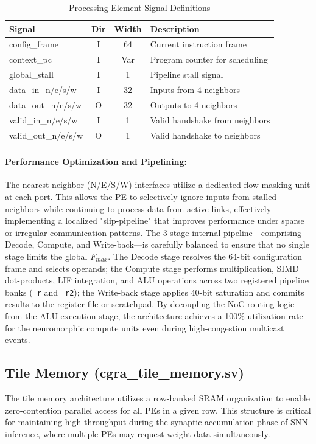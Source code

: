 \begin{table}[ht!]
\centering
\singlespacing
\renewcommand{\arraystretch}{1.1}
\caption{Processing Element Signal Definitions}
\label{tab:signals_pe}
\begin{tabular}{|l|c|c|l|}
\hline
\textbf{Signal} & \textbf{Dir} & \textbf{Width} & \textbf{Description} \\ \hline
config\_frame & I & 64 & Current instruction frame \\
context\_pc & I & Var & Program counter for scheduling \\
global\_stall & I & 1 & Pipeline stall signal \\
data\_in\_n/e/s/w & I & 32 & Inputs from 4 neighbors \\
data\_out\_n/e/s/w & O & 32 & Outputs to 4 neighbors \\
valid\_in\_n/e/s/w & I & 1 & Valid handshake from neighbors \\
valid\_out\_n/e/s/w & O & 1 & Valid handshake to neighbors \\ \hline
\end{tabular}
\end{table}

\paragraph{Performance Optimization and Pipelining:} 
The nearest-neighbor (N/E/S/W) interfaces utilize a dedicated flow-masking unit at each port. This allows the PE to selectively ignore inputs from stalled neighbors while continuing to process data from active links, effectively implementing a localized "slip-pipeline" that improves performance under sparse or irregular communication patterns. The 3-stage internal pipeline—comprising Decode, Compute, and Write-back—is carefully balanced to ensure that no single stage limits the global $F_{max}$. The Decode stage resolves the 64-bit configuration frame and selects operands; the Compute stage performs multiplication, SIMD dot-products, LIF integration, and ALU operations across two registered pipeline banks (\texttt{\_r} and \texttt{\_r2}); the Write-back stage applies 40-bit saturation and commits results to the register file or scratchpad. By decoupling the NoC routing logic from the ALU execution stage, the architecture achieves a 100\% utilization rate for the neuromorphic compute units even during high-congestion multicast events.

\subsection{Tile Memory (cgra\_tile\_memory.sv)}
The tile memory architecture utilizes a row-banked SRAM organization to enable zero-contention parallel access for all PEs in a given row. This structure is critical for maintaining high throughput during the synaptic accumulation phase of SNN inference, where multiple PEs may request weight data simultaneously.

